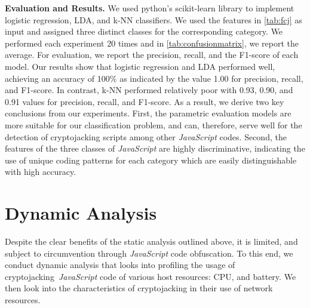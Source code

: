\documentclass[acmlarge]{acmart}
\newcommand{\BfPara}[1]{{\noindent\bf#1.}\xspace\xspace}
\newcommand{\js}{{\em JavaScript}\xspace}
\newcommand{\cj}{cryptojacking\xspace}
\begin{document}
{\BfPara{Evaluation and Results} We used python's scikit-learn library to implement logistic regression, LDA, and k-NN classifiers. We used the features in \autoref{tab:fcj} as input and assigned three distinct classes for the corresponding category. We performed each experiment 20 times and in \autoref{tab:confusionmatrix}, we report the average. For evaluation, we report the precision, recall, and the F1-score of each model. Our results show that logistic regression and LDA performed well, achieving an accuracy of 100\% as indicated by the value 1.00 for precision, recall, and F1-score. In contrast, k-NN performed relatively poor with 0.93, 0.90, and 0.91 values for precision, recall, and F1-score. As a result, we derive two key conclusions from our experiments. First, the parametric evaluation models are more suitable for our classification problem, and can, therefore, serve well for the detection of \cj scripts among other \js codes. Second, the features of the three classes of \js are highly discriminative, indicating the use of unique coding patterns for each category which are easily distinguishable with high accuracy.} 







\section{Dynamic Analysis} \label{sec:dynamic}
Despite the clear benefits of the static analysis outlined above, it is limited, and subject to circumvention through \js code obfuscation. To this end, we conduct dynamic analysis that looks into profiling the usage of \cj~\js code of various host resources: CPU, and battery. We then look into the characteristics of \cj in their use of network resources.



\end{document}
